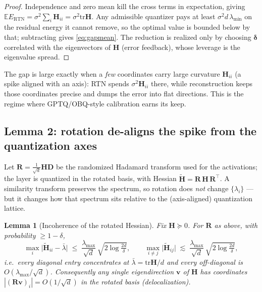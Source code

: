 \documentclass[11pt]{article}
\newtheorem{lemma}{Lemma}
\theoremstyle{remark}
\newcommand{\E}{\mathbb{E}}
\newcommand{\tr}{\mathrm{tr}}
\newcommand{\Hm}{\bm H}
\begin{document}
\begin{proof}
Independence and zero mean kill the cross terms in expectation, giving
$\E E_{\mathrm{RTN}}=\sigma^2\sum_i\Hm_{ii}=\sigma^2\tr\Hm$. Any admissible
quantizer pays at least $\sigma^2 d\,\lambda_{\min}$ on the residual energy it
cannot remove, so the optimal value is bounded below by that; subtracting gives
\eqref{eq:gapmean}. The reduction is realized only by choosing $\bm\delta$
correlated with the eigenvectors of $\Hm$ (error feedback), whose leverage is
the eigenvalue spread.
\end{proof}

The gap is large exactly when a \emph{few} coordinates carry large curvature
$\Hm_{ii}$ (a spike aligned with an axis): RTN spends $\sigma^2\Hm_{ii}$ there,
while reconstruction keeps those coordinates precise and dumps the error into
flat directions. This is the regime where GPTQ/OBQ-style calibration earns its
keep.

\subsection{Lemma 2: rotation de-aligns the spike from the quantization axes}

Let $\bm R=\tfrac1{\sqrt d}\bm H\bm D$ be the randomized Hadamard transform used
for the activations; the layer is quantized in the rotated basis, with Hessian
$\tilde{\Hm}=\bm R\,\Hm\,\bm R^{\!\top}$. A similarity transform preserves the
spectrum, so rotation does \emph{not} change $\{\lambda_i\}$ --- but it changes
how that spectrum sits relative to the (axis-aligned) quantization lattice.

\begin{lemma}[Incoherence of the rotated Hessian]
\label{lem:rotH}
Fix $\Hm\succeq 0$. For $\bm R$ as above, with probability $\ge 1-\delta$,
\begin{equation}
\label{eq:diag}
\max_i\big|\tilde{\Hm}_{ii}-\bar\lambda\big|
   \;\le\; \frac{\lambda_{\max}}{\sqrt d}\,\sqrt{2\log\tfrac{2d}{\delta}},
\qquad
\max_{i\neq j}\big|\tilde{\Hm}_{ij}\big|
   \;\lesssim\; \frac{\lambda_{\max}}{\sqrt d}\,\sqrt{2\log\tfrac{2d}{\delta}},
\end{equation}
i.e.\ every diagonal entry concentrates at $\bar\lambda=\tr\Hm/d$ and every
off-diagonal is $O(\lambda_{\max}/\sqrt d)$. Consequently any single
eigendirection $\bm v$ of $\Hm$ has coordinates
$|(\bm R\bm v)_i|=O(1/\sqrt d)$ in the rotated basis (delocalization).
\end{lemma}
\end{document}
